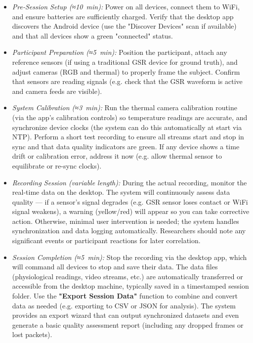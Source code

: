 \begin{itemize}
\item \textit{Pre-Session Setup (≈10 min):} Power on all devices, connect them to
  WiFi, and ensure batteries are sufficiently charged. Verify that the
  desktop app discovers the Android device (use the "Discover Devices"
  scan if available) and that all devices show a green "connected"
  status.\cite{ref18}\cite{ref20}

\item \textit{Participant Preparation (≈5 min):} Position the participant, attach
  any reference sensors (if using a traditional GSR device for ground
  truth), and adjust cameras (RGB and thermal) to properly frame the
  subject. Confirm that sensors are reading signals (e.g. check that the
  GSR waveform is active and camera feeds are visible).

\item \textit{System Calibration (≈3 min):} Run the thermal camera calibration
  routine (via the app's calibration controls) so temperature readings
  are accurate, and synchronize device clocks (the system can do this
  automatically at start via NTP). Perform a short test recording to
  ensure all streams start and stop in sync and that data quality
  indicators are
  green\cite{ref21}.
  If any device shows a time drift or calibration error, address it now
  (e.g. allow thermal sensor to equilibrate or re-sync clocks).

\item \textit{Recording Session (variable length):} During the actual recording,
  monitor the real-time data on the desktop. The system will
  continuously assess data quality --- if a sensor's signal degrades
  (e.g. GSR sensor loses contact or WiFi signal weakens), a warning
  (yellow/red) will appear so you can take corrective
  action\cite{ref18}.
  Otherwise, minimal user intervention is needed; the system handles
  synchronization and data logging automatically. Researchers should
  note any significant events or participant reactions for later
  correlation.

\item \textit{Session Completion (≈5 min):} Stop the recording via the desktop app,
  which will command all devices to stop and save their data. The data
  files (physiological readings, video streams, etc.) are automatically
  transferred or accessible from the desktop machine, typically saved in
  a timestamped session folder. Use the \textbf{"Export Session Data"}
  function to combine and convert data as needed (e.g. exporting to CSV
  or JSON for
  analysis)\cite{ref18}.
  The system provides an export wizard that can output synchronized
  datasets and even generate a basic quality assessment report
  (including any dropped frames or lost
  packets)\cite{ref22}\cite{ref23}.


\end{itemize}
